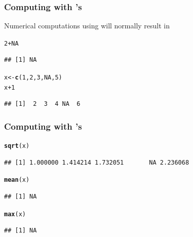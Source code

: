 \documentclass[12pt]{beamer}\usepackage[]{graphicx}\usepackage[]{color}
\makeatletter
\newcommand{\hlnum}[1]{\textcolor[rgb]{0.686,0.059,0.569}{#1}}%
\newcommand{\hlopt}[1]{\textcolor[rgb]{0,0,0}{#1}}%
\newcommand{\hlstd}[1]{\textcolor[rgb]{0.345,0.345,0.345}{#1}}%
\newcommand{\hlkwb}[1]{\textcolor[rgb]{0.69,0.353,0.396}{#1}}%
\newcommand{\hlkwd}[1]{\textcolor[rgb]{0.737,0.353,0.396}{\textbf{#1}}}%
\newenvironment{kframe}{%
 \def\at@end@of@kframe{}%
 \ifinner\ifhmode%
  \def\at@end@of@kframe{\end{minipage}}%
  \begin{minipage}{\columnwidth}%
 \fi\fi%
 \def\FrameCommand##1{\hskip\@totalleftmargin \hskip-\fboxsep
 \colorbox{shadecolor}{##1}\hskip-\fboxsep
     \hskip-\linewidth \hskip-\@totalleftmargin \hskip\columnwidth}%
 \MakeFramed {\advance\hsize-\width
   \@totalleftmargin\z@ \linewidth\hsize
   \@setminipage}}%
 {\par\unskip\endMakeFramed%
 \at@end@of@kframe}
\newenvironment{knitrout}{}{} %
\makeatother
\begin{document}

\begin{frame}
\begin{center}
\Huge{}
\end{center}
\end{frame}


\begin{frame}[fragile]
\frametitle{Computing with 's}

Numerical computations using  will normally result in 
\begin{knitrout}\footnotesize
{}\color{fgcolor}\begin{kframe}
\begin{alltt}
\hlnum{2} \hlopt{+} \hlnum{NA}
\end{alltt}
\begin{verbatim}
## [1] NA
\end{verbatim}
\begin{alltt}
\hlstd{x} \hlkwb{<-} \hlkwd{c}\hlstd{(}\hlnum{1}\hlstd{,} \hlnum{2}\hlstd{,} \hlnum{3}\hlstd{,} \hlnum{NA}\hlstd{,} \hlnum{5}\hlstd{)}
\hlstd{x} \hlopt{+} \hlnum{1}
\end{alltt}
\begin{verbatim}
## [1]  2  3  4 NA  6
\end{verbatim}
\end{kframe}
\end{knitrout}

\end{frame}


\begin{frame}[fragile]
\frametitle{Computing with 's}

\begin{knitrout}\footnotesize
{}\color{fgcolor}\begin{kframe}
\begin{alltt}
\hlkwd{sqrt}\hlstd{(x)}
\end{alltt}
\begin{verbatim}
## [1] 1.000000 1.414214 1.732051       NA 2.236068
\end{verbatim}
\begin{alltt}
\hlkwd{mean}\hlstd{(x)}
\end{alltt}
\begin{verbatim}
## [1] NA
\end{verbatim}
\begin{alltt}
\hlkwd{max}\hlstd{(x)}
\end{alltt}
\begin{verbatim}
## [1] NA
\end{verbatim}
\end{kframe}
\end{knitrout}

\end{frame}
\end{document}
